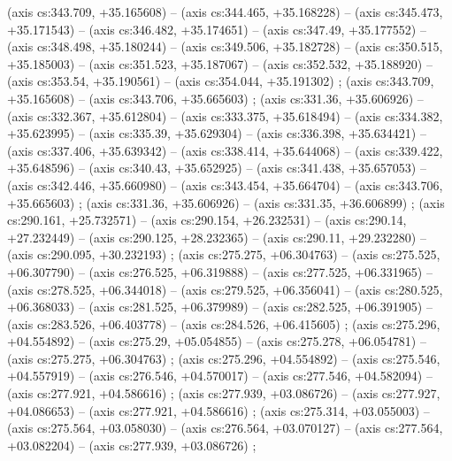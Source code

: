     (axis cs:343.709,    +35.165608) --  (axis cs:344.465,    +35.168228) --  (axis cs:345.473,    +35.171543) --  (axis cs:346.482,    +35.174651) --  (axis cs:347.49,    +35.177552) --  (axis cs:348.498,    +35.180244) --  (axis cs:349.506,    +35.182728) --  (axis cs:350.515,    +35.185003) --  (axis cs:351.523,    +35.187067) --  (axis cs:352.532,    +35.188920) --  (axis cs:353.54,    +35.190561) --  (axis cs:354.044,    +35.191302) ;
    (axis cs:343.709,    +35.165608) --  (axis cs:343.706,    +35.665603) ;
    (axis cs:331.36,    +35.606926) --  (axis cs:332.367,    +35.612804) --  (axis cs:333.375,    +35.618494) --  (axis cs:334.382,    +35.623995) --  (axis cs:335.39,    +35.629304) --  (axis cs:336.398,    +35.634421) --  (axis cs:337.406,    +35.639342) --  (axis cs:338.414,    +35.644068) --  (axis cs:339.422,    +35.648596) --  (axis cs:340.43,    +35.652925) --  (axis cs:341.438,    +35.657053) --  (axis cs:342.446,    +35.660980) --  (axis cs:343.454,    +35.664704) --  (axis cs:343.706,    +35.665603) ;
    (axis cs:331.36,    +35.606926) --  (axis cs:331.35,    +36.606899) ;
    (axis cs:290.161,    +25.732571) --  (axis cs:290.154,    +26.232531) --  (axis cs:290.14,    +27.232449) --  (axis cs:290.125,    +28.232365) --  (axis cs:290.11,    +29.232280) --  (axis cs:290.095,    +30.232193) ;
    (axis cs:275.275,    +06.304763) --  (axis cs:275.525,    +06.307790) --  (axis cs:276.525,    +06.319888) --  (axis cs:277.525,    +06.331965) --  (axis cs:278.525,    +06.344018) --  (axis cs:279.525,    +06.356041) --  (axis cs:280.525,    +06.368033) --  (axis cs:281.525,    +06.379989) --  (axis cs:282.525,    +06.391905) --  (axis cs:283.526,    +06.403778) --  (axis cs:284.526,    +06.415605) ;
    (axis cs:275.296,    +04.554892) --  (axis cs:275.29,    +05.054855) --  (axis cs:275.278,    +06.054781) --  (axis cs:275.275,    +06.304763) ;
    (axis cs:275.296,    +04.554892) --  (axis cs:275.546,    +04.557919) --  (axis cs:276.546,    +04.570017) --  (axis cs:277.546,    +04.582094) --  (axis cs:277.921,    +04.586616) ;
    (axis cs:277.939,    +03.086726) --  (axis cs:277.927,    +04.086653) --  (axis cs:277.921,    +04.586616) ;
    (axis cs:275.314,    +03.055003) --  (axis cs:275.564,    +03.058030) --  (axis cs:276.564,    +03.070127) --  (axis cs:277.564,    +03.082204) --  (axis cs:277.939,    +03.086726) ;
